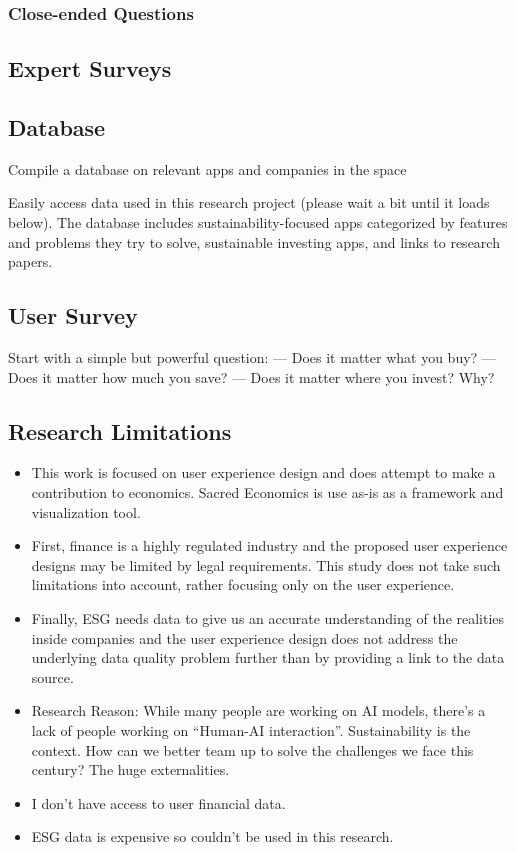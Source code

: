 \documentclass[
  letterpaper,
  DIV=11,
  numbers=noendperiod]{scrartcl}
\begin{document}
\subsubsection{Close-ended Questions}\label{close-ended-questions}

\subsection{Expert Surveys}\label{expert-surveys}

\subsection{Database}\label{database}

Compile a database on relevant apps and companies in the space

Easily access data used in this research project (please wait a bit
until it loads below). The database includes sustainability-focused apps
categorized by features and problems they try to solve, sustainable
investing apps, and links to research papers.

\subsection{User Survey}\label{user-survey}

Start with a simple but powerful question: --- Does it matter what you
buy? --- Does it matter how much you save? --- Does it matter where you
invest? Why?

\subsection{Research Limitations}\label{research-limitations}

\begin{itemize}
\item
  This work is focused on user experience design and does attempt to
  make a contribution to economics. Sacred Economics is use as-is as a
  framework and visualization tool.
\item
  First, finance is a highly regulated industry and the proposed user
  experience designs may be limited by legal requirements. This study
  does not take such limitations into account, rather focusing only on
  the user experience.
\item
  Finally, ESG needs data to give us an accurate understanding of the
  realities inside companies and the user experience design does not
  address the underlying data quality problem further than by providing
  a link to the data source.
\item
  Research Reason: While many people are working on AI models, there's a
  lack of people working on ``Human-AI interaction''. Sustainability is
  the context. How can we better team up to solve the challenges we face
  this century? The huge externalities.
\item
  I don't have access to user financial data.
\item
  ESG data is expensive so couldn't be used in this research.
\end{itemize}
\end{document}

